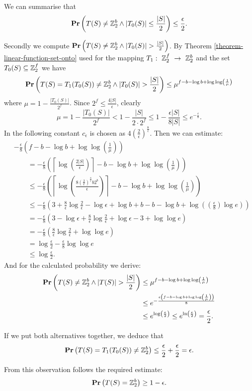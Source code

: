 We can summarise that
\[ 
\mathbf{Pr}\left(T(S) \neq \mathbb{Z}_{2}^{b} \wedge |T_0(S)| \leq \frac{|S|}{2}\right) \leq \frac{\epsilon}{2} \text{.}
\]

Secondly we compute $\mathbf{Pr}\left(T(S) \neq \mathbb{Z}_{2}^{b} \wedge |T_0(S)| > \frac{|S|}{2}\right)$. By Theorem \ref{theorem-linear-function-set-onto} used for the mapping $T_1:~\mathbb{Z}_{2}^{f}~\rightarrow~\mathbb{Z}_{2}^{b}$ and the set $T_0(S) \subseteq \mathbb{Z}_{2}^{f}$ we have
\[
	\mathbf{Pr}\left(T(S) = T_1(T_0(S)) \neq \mathbb{Z}_{2}^{b} \wedge |T_0(S)| > \frac{|S|}{2}\right) \leq \mu ^ {f - b - \log b  +\log\log \left(\frac{1}{\mu}\right) } 
\]
where $\mu = 1- \frac{|T_0(S)|}{2 ^ f}$. Since $2 ^ f \leq \frac{4|S|}{\epsilon}$, clearly
\[
\mu = 1 - \frac{|T_0(S)|}{2 ^ f} < 1 - \frac{|S|}{2 \cdot 2 ^ f} \leq 1 - \frac{\epsilon |S|}{8|S|} \leq e^{-\frac{\epsilon}{8}}
\text{.}
\]
In the following constant $c_{\epsilon}$ is chosen as $4\left(\frac{2}{\epsilon}\right) ^ {\frac{8}{\epsilon}}$. Then we can estimate:
\[
\begin{split}
& -\frac{\epsilon}{8} \left(f - b - \log b + \log \log \left( \frac{1}{\mu} \right) \right) \\
& \qquad = -\frac{\epsilon}{8}\left(\left\lceil\log\left(\frac{2|S|}{\epsilon}\right)\right\rceil - b - \log b + \log\log\left(\frac{1}{\mu}\right)\right) \\
& \qquad \leq -\frac{\epsilon}{8} \left( \left\lceil \log\left( \frac{8 \left(\frac{2}{\epsilon}\right) ^ {\frac{8}{\epsilon}}b2^b}{\epsilon} \right) \right\rceil - b - \log b + \log\log\left(\frac{1}{\mu}\right)\right) \\
& \qquad \leq -\frac{\epsilon}{8} \left(3 + \frac{8}{\epsilon}\log\frac{2}{\epsilon} - \log\epsilon + \log b + b - b - \log b + \log \left( \left(\frac{\epsilon}{8}\right)\log e \right) \right) \\
& \qquad = -\frac{\epsilon}{8} \left(3 - \log\epsilon + \frac{8}{\epsilon} \log \frac{2}{\epsilon} + \log\epsilon - 3 + \log\log e\right) \\
& \qquad = -\frac{\epsilon}{8}\left(\frac{8}{\epsilon}\log \frac{2}{\epsilon} + \log\log e\right) \\
& \qquad = \log \frac{\epsilon}{2} - \frac{\epsilon}{8} \log\log e \\
& \qquad \leq \log\frac{\epsilon}{2} \text{.}
\end{split}
\]
And for the calculated probability we derive:
\[
\begin{split}
\mathbf{Pr}\left(T(S) \neq \mathbb{Z}_{2}^{b} \wedge |T(S)| > \frac{|S|}{2}\right) 
	& \leq \mu ^ {f - b - \log b + \log\log\left(\frac{1}{\mu}\right)} \\
	& \leq e ^ {-\frac{\epsilon\left(f - b - \log b + \log\log\left(\frac{1}{\mu}\right)\right)}{8}} \\
	& \leq e ^ {\log \left( \frac{\epsilon}{2} \right)} \leq e ^ {\ln \left(\frac{\epsilon}{2}\right)} = \frac{\epsilon}{2} \text{.}
\end{split}
\]

If we put both alternatives together, we deduce that 
\[ 
	\mathbf{Pr}\left(T(S) = T_1(T_0(S)) \neq \mathbb{Z}_{2}^{b}\right) \leq \frac{\epsilon}{2} + \frac{
\epsilon}{2} = \epsilon \text{.}
\]

From this observation follows the required estimate: \[ \mathbf{Pr}\left(T(S) = \mathbb{Z}_{2}^{b}\right) \geq 1 - \epsilon \text{.} \]
